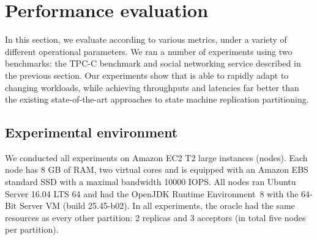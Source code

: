 \section{Performance evaluation}
\label{sec:experiments}

In this section, we evaluate \dynastar{} according to various metrics,
under a variety of different operational parameters.
We ran a number of experiments using two benchmarks: the TPC-C benchmark and
\appname{} social networking service described in the previous section.
Our experiments show that \dynastar{} is able to rapidly adapt to changing 
workloads, while achieving throughputs and latencies far better than the existing
state-of-the-art approaches to state machine replication partitioning.


\subsection{Experimental environment}
\label{sec:evaluation:setup}

We conducted all experiments on Amazon EC2 T2 large instances (nodes). Each node has 8 GB of RAM, 
two virtual cores and is equipped with an Amazon EBS standard SSD with a maximal bandwidth 10000 IOPS.
All nodes ran Ubuntu Server 16.04 LTS 64 and had the OpenJDK Runtime Environment~8 with the
\mbox{64-Bit} Server VM (build 25.45-b02). In all experiments, the oracle 
had the same resources as every other partition: 2 replicas and 3 acceptors 
(in total five nodes per partition).




